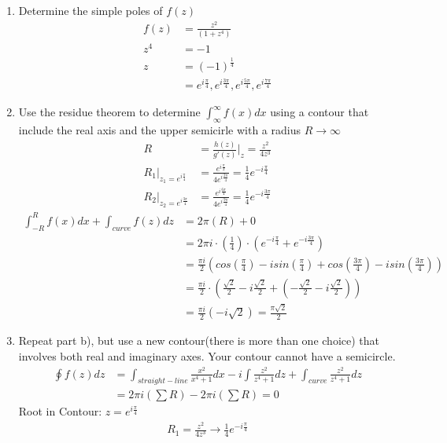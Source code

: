 \documentclass[12pt]{article}
\begin{document}
\begin{enumerate}
\begin{enumerate}
	    \item Determine the simple poles of $f(z)$
		    \begin{align*}
			f(z)&=\frac{z^{2}}{(1+z^{4})}\\
			z^{4}&=-1\\
			z&=(-1)^{\frac{1}{4}}\\
			&=e^{i \frac{\pi}{4}}, e^{i \frac{3\pi}{4}}, e^{i \frac{5\pi}{4}}, e^{i \frac{7\pi}{4}}
		\end{align*}
	\item Use the residue theorem to determine $\int_{\infty}^{\infty} f(x)dx$ using a contour that include the real axis and the upper semicirle with a radius $R \to \infty$
		\begin{align*}
			R&= \frac{h(z)}{g'(z)}|_{z}=\frac{z^{2}}{4z^{3}}\\
			R_{1}|_{z_{1}=e^{i \frac{\pi}{4}}} &= \frac{e^{i \frac{\pi}{2}}}{4e^{i \frac{2\pi}{4}}}=\frac{1}{4}e^{-i \frac{\pi}{4}}\\
			R_{2}|_{z_{2}=e^{i \frac{3\pi}{4}}}&=\frac{e^{i \frac{6\pi}{4}}}{4e^{i \frac{9\pi}{4}}} = \frac{1}{4}e^{-i \frac{3\pi}{4}}
		\end{align*}
		\begin{align*}
			\int_{-R}^{R}f(x)dx+\int_{curve}f(z)dz &= 2\pi(R)+0\\
							       &=2\pi i \cdot (\frac{1}{4})\cdot (e^{-i \frac{\pi}{4}}+e^{-i \frac{3\pi}{4}})\\
							       &= \frac{\pi i}{2}(cos(\frac{\pi}{4})-isin(\frac{\pi}{4})+cos(\frac{3\pi}{4})-isin(\frac{3\pi}{4}))\\
							       &=\frac{\pi i}{2}\cdot (\frac{\sqrt{2}}{2}-i \frac{\sqrt{2}}{2}+(-\frac{\sqrt{2}}{2}-i \frac{\sqrt{2}}{2}))\\
							       &= \frac{\pi i}{2}(-i\sqrt{2})=\frac{\pi \sqrt{2}}{2}
		\end{align*}
			\item Repeat part b), but use a new contour(there is more than one choice) that involves both real and imaginary axes. Your contour cannot have a semicircle.
	\begin{align*}
		\oint f(z)dz &= \int_{straight-line} \frac{x^{2}}{x^{4}+1}dx-i\int \frac{z^{2}}{z^{4}+1}dz+\int_{curve} \frac{z^{2}}{z^{4}+1}dz\\
			     &= 2\pi i(\sum R) - 2\pi i(\sum R)=0
	\end{align*}
	Root in Contour: $z=e^{i \frac{\pi}{4}}$
	\begin{align*}
	  R_{1}=\frac{z^{2}}{4z^{3}}\rightarrow \frac{1}{4}e^{-i \frac{\pi}{4}}  

\end{align*}
\end{enumerate}
\end{enumerate}
\end{document}
